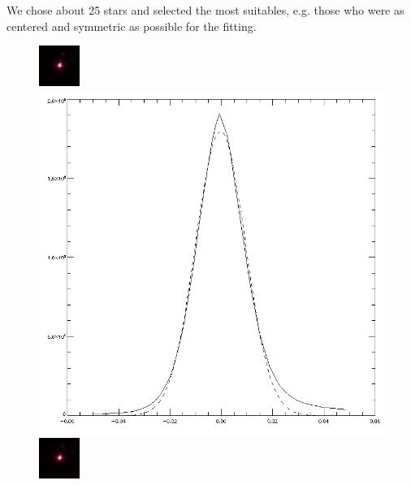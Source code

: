 We chose about 25 stars and selected the most suitables, e.g. those who were as centered and symmetric as possible for the fitting. 
\begin{figure}[H]

\begin{minipage}{0.2 \textwidth}
		\includegraphics[scale = 2]{figures/Exposures/PSF_I}
\end{minipage}
\begin{minipage}{0.2 \textwidth}
\vspace{3pt}
\hspace{15pt}
		\includegraphics[scale=0.148]{figures/Exposures/psf_noise_I.png}
\end{minipage}
\hspace{50pt}
\begin{minipage}{0.2 \textwidth}
		\includegraphics[scale = 2]{figures/Exposures/PSF_I}
\end{minipage}
\begin{minipage}{0.2\textwidth}

\end{minipage}
\end{figure}
